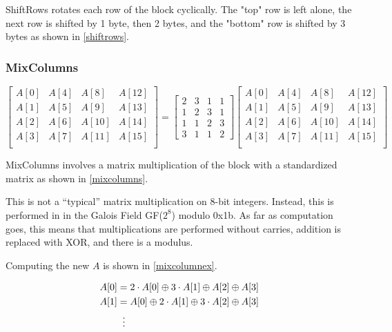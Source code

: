 \documentclass[a4paper,10pt]{article}
\begin{document}
ShiftRows rotates each row of the block cyclically.  The "top" row is left alone, the next row is shifted by 1 byte, then 2 bytes, and the "bottom" row is shifted by 3 bytes as shown in \ref{shiftrows}.

\subsubsection{MixColumns}

\begin{equation}
 \begin{bmatrix}
  A[0] & A[4] & A[8] & A[12] \\
  A[1] & A[5] & A[9] & A[13] \\
  A[2] & A[6] & A[10] & A[14] \\
  A[3] & A[7] & A[11] & A[15] \\
 \end{bmatrix}
 =
 \begin{bmatrix}
  2 & 3 & 1 & 1 \\
  1 & 2 & 3 & 1 \\
  1 & 1 & 2 & 3 \\
  3 & 1 & 1 & 2
 \end{bmatrix}
  \begin{bmatrix}
  A[0] & A[4] & A[8] & A[12] \\
  A[1] & A[5] & A[9] & A[13] \\
  A[2] & A[6] & A[10] & A[14] \\
  A[3] & A[7] & A[11] & A[15] \\
 \end{bmatrix}
 \label{mixcolumns}
\end{equation}

MixColumns involves a matrix multiplication of the block with a standardized matrix as shown in \eqref{mixcolumns}.

This is not a ``typical'' matrix multiplication on 8-bit integers.  Instead, this is performed in in the Galois Field GF($2^8$) modulo 0x1b.  As far as computation goes, this means that multiplications are performed without carries, addition is replaced with XOR, and there is a modulus\cite{galois}.

Computing the new $A$ is shown in \eqref{mixcolumnex}.

\begin{align}
 \label{mixcolumnex}
 A[0] &= 2 \cdot A[0] \oplus 3 \cdot A[1] \oplus A[2] \oplus A[3] \\
 A[1] &= A[0] \oplus 2 \cdot A[1] \oplus 3 \cdot A[2] \oplus A[3] \\
 &\;\;\vdots \notag
\end{align}
\end{document}

